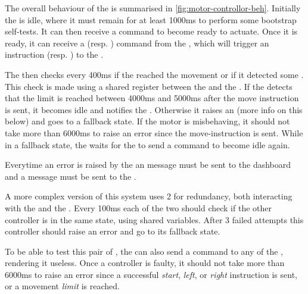 \documentclass[11pt]{article}
\begin{document}
The overall behaviour of the  is summarised in \cref{fig:motor-controllor-beh}.
Initially the  is idle, where it must remain for at least 1000ms to perform some bootstrap self-tests. It can then receive a  command to become ready to actuate.
Once it is ready, it can receive a  (resp. ) command from the , which will trigger an instruction  (resp. ) to the .

The  then checks every 400ms if the  reached the movement  or if it detected some . This check is made using a shared register between the  and the .
If the  detects that the limit is reached between 4000ms and 5000ms after the move instruction is sent, it becomes idle and notifies the . Otherwise it 
raises an  (more info on this below) and goes to a fallback state.
%
If the motor is misbehaving, it should not take more than 6000ms to raise an error since the move-instruction is sent.
While in a fallback state, the  waits for the  to send a  command to become idle again.


Everytime an error is raised by the 
an  message must be sent to the dashboard and
a  message must be sent to the .

A more complex version of this system uses 2  for redundancy, both interacting with the  and the .
Every 100ms each of the two  should check if the other controller is in the same state, using shared variables. After 3 failed attempts this controller should raise an error and go to its fallback state.

To be able to test this pair of , the  can also send a  command to any of the , rendering it useless.
Once a controller is faulty, it should not take more than 6000ms to raise an error since a successful \emph{start}, \emph{left}, or \emph{right} instruction is sent, or a movement \emph{limit} is reached.
\end{document}
